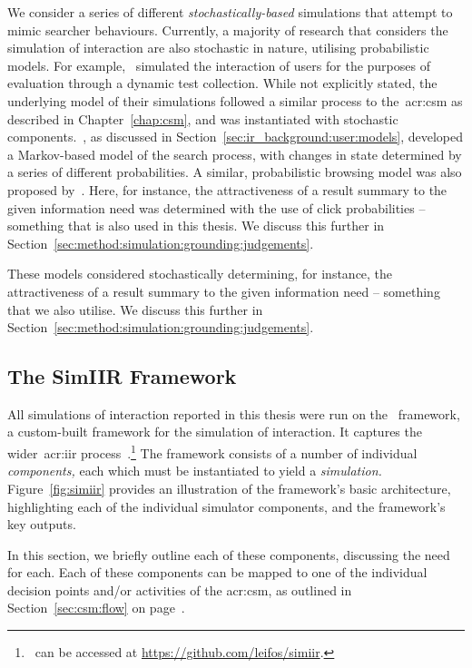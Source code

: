  We consider a series of different \emph{stochastically-based} simulations that attempt to mimic searcher behaviours. Currently, a majority of research that considers the simulation of interaction are also stochastic in nature, utilising probabilistic models. For example,~\cite{carterette2011effectiveness_evaluation} simulated the interaction of users for the purposes of evaluation through a dynamic test collection. While not explicitly stated, the underlying model of their simulations followed a similar process to the~\gls{acr:csm} as described in Chapter~\ref{chap:csm}, and was instantiated with stochastic components.~\cite{baskaya2013behavioural_factors}, as discussed in Section~\ref{sec:ir_background:user:models}, developed a Markov-based model of the search process, with changes in state determined by a series of different probabilities. A similar, probabilistic browsing model was also proposed by~\cite{yilmaz2010browsing_utility}. Here, for instance, the attractiveness of a result summary to the given information need was determined with the use of click probabilities -- something that is also used in this thesis. We discuss this further in Section~\ref{sec:method:simulation:grounding:judgements}.


These models considered stochastically determining, for instance, the attractiveness of a result summary to the given information need -- something that we also utilise. We discuss this further in Section~\ref{sec:method:simulation:grounding:judgements}.

\subsection{The SimIIR Framework}\label{sec:method:simulation:simiir}
All simulations of interaction reported in this thesis were run on the \simiir~framework, a custom-built framework for the simulation of interaction. It captures the wider~\gls{acr:iir} process~\citep{maxwell2016simiir}.\footnote{\simiir~can be accessed at \url{https://github.com/leifos/simiir}. } The framework consists of a number of individual \emph{components,} each which must be instantiated to yield a \emph{simulation.} Figure~\ref{fig:simiir} provides an illustration of the framework's basic architecture, highlighting each of the individual simulator components, and the framework's key outputs.

In this section, we briefly outline each of these components, discussing the need for each. Each of these components can be mapped to one of the individual decision points and/or activities of the \gls{acr:csm}, as outlined in Section~\ref{sec:csm:flow} on page~\pageref{sec:csm:flow}.

